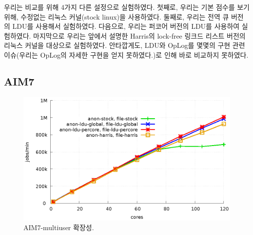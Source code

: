 우리는 비교를 위해 4가지 다른 설정으로 실험하였다. 
첫째로, 우리는 기본 점수를 보기 위해, 수정없는 리눅스 커널(stock linux)을 사용하였다.
둘째로, 우리는 전역 큐 버전의 LDU를 사용해서 실험하였다.  
다음으로, 우리는 퍼코어 버전의 LDU를 사용하여 실험하였다. 
마지막으로 우리는 앞에서 설명한 Harris의 lock-free 링크드 리스트 버전의 리눅스 커널을 대상으로 
실험하였다.  
안타깝게도, LDU와 OpLog를 몇몇의 구현 관련 이슈(우리는 OpLog의 자세한 구현을 얻지 못하였다.)로
 인해 바로 비교하지 못하였다.

 

\subsection{AIM7}


 
\begin{figure}[tb]
  \begin{center}
    \includegraphics[scale=0.8]{graph/aim7.eps}
  \end{center}
  \caption{AIM7-multiuser 확장성.}
  \label{fig:aim7}
\end{figure}


